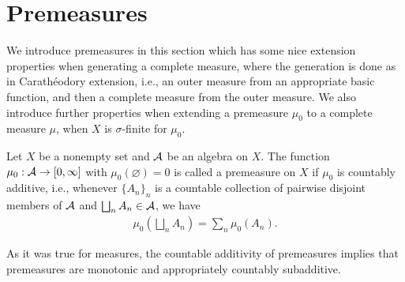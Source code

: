 \section{Premeasures}

We introduce premeasures in this section which has some nice extension properties when generating a complete measure, where the generation is done as in Carath\'{e}odory extension, i.e., an outer measure from an appropriate basic function, and then a complete measure from the outer measure.
We also introduce further properties when extending a premeasure $\mu_0$ to a complete measure $\mu$, when $X$ is $\sigma$-finite for $\mu_0$.

\begin{defi}[Premeasures]
    Let $X$ be a nonempty set and ${\mathcal{A}}$ be an algebra on $X$.
    The function $\mu_0: {\mathcal{A}}\rightarrow[0, \infty]$ with $\mu_0(\varnothing)=0$ is called a premeasure on $X$ if $\mu_0$ is countably additive, i.e., whenever $\{A_n\}_n$ is a countable collection of pairwise disjoint members of ${\mathcal{A}}$ and $\bigsqcup_n A_n\in{\mathcal{A}}$, we have
    \begin{align*}
        \mu_0\left(\bigsqcup_n A_n\right)=\sum_n\mu_0(A_n).
    \end{align*}
\end{defi}
\begin{rmk}
    As it was true for measures, the countable additivity of premeasures implies that premeasures are monotonic and appropriately countably subadditive.
\end{rmk}


